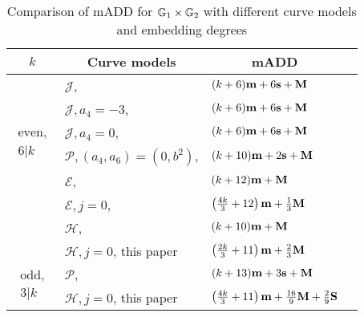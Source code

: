 \begin{table}[h]
\centering
\caption{Comparison of mADD for $\mathbb{G}_{1} \times \mathbb{G}_{2}$ with different curve models and embedding degrees}

\begin{tabular}{| l | l | l | l}
\hline
\multicolumn{1}{|c|}{$k$}
&\multicolumn{1}{|c|}{Curve models}	&\multicolumn{1}{c|}{mADD}	\\
\hline
\multicolumn{1}{|c|}{\multirow{6}{*}{
$\begin{array}{c} \text{even,} \\ 6|k \end{array}$}}
&$\mathcal{J}$, \cite{2008/IonicaJoux08} \cite{2009/fastertate}
		&$(k+ 6)\textbf{m} + 6\textbf{s} + \textbf{M} $	\\
&$\mathcal{J},a_4 = -3$, \cite{2009/fastertate}
	&$(k+ 6)\textbf{m} + 6\textbf{s} + \textbf{M}$	\\
&$\mathcal{J},a_4 = 0$, \cite{2009/fastertate}		
	&$(k + 6)\textbf{m} + 6\textbf{s} + \textbf{M}$	\\
&$\mathcal{P},(a_4,a_6) = (0, b^2)$, \cite{2009/craig}
		&$(k + 10)\textbf{m} + 2\textbf{s} + \textbf{M}$	\\
&$\mathcal{E}$, \cite{2009/fastertate}			
		&$(k+ 12)\textbf{m} + \textbf{M}$	\\
&$\mathcal{E},j=0$, \cite{2014/LWZ}
				&$\left(\frac{4k}{3} + 12\right)\textbf{m}  + \frac{1}{3}\textbf{M}$ \\
&$\mathcal{H}$, \cite{2010/Gu}	&$(k + 10)\textbf{m} + \textbf{M}$	\\
&$\mathcal{H},j=0$, this paper 	&
$ \left(\frac{2k}{3} + 11\right)\textbf{m} + \frac{2}{3}\textbf{M}$	\\
\hline
\multicolumn{1}{|c|}{\multirow{2}{*}{
$\begin{array}{c} \text{odd,} \\ 3|k \end{array}$}}
&$\mathcal{P}$, \cite{2010/CLN}		&$(k + 13)\textbf{m} + 3\textbf{s} + \textbf{M}$	\\
&$\mathcal{H},j=0$, this paper
&$\left(\frac{4k}{3} + 11\right)\textbf{m} + \frac{16}{9}\textbf{M} + \frac{2}{9}\textbf{S} $	\\
\hline
\end{tabular}
\label{tbl-cmp1a}


\end{table}

